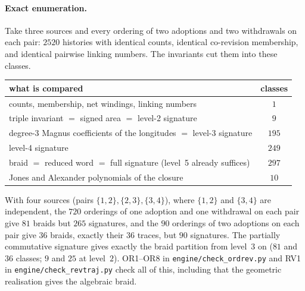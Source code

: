 \documentclass[11pt]{article}
\theoremstyle{definition}\newtheorem{definition}[theorem]{Definition}\newtheorem{remark}[theorem]{Remark}\newtheorem{example}[theorem]{Example}\newtheorem{problem}[theorem]{Open problem}\crefname{problem}{Problem}{Problems}
\begin{document}
\paragraph{Exact enumeration.} Take three sources and every ordering of two adoptions and two withdrawals on each pair: $2520$ histories with identical counts, identical co-revision membership, and identical pairwise linking numbers. The invariants cut them into these classes.
\begin{center}\small
\begin{tabular}{@{}lc@{}}
\toprule
what is compared & classes\\\midrule
counts, membership, net windings, linking numbers & $1$\\
triple invariant $=$ signed area $=$ level-2 signature & $9$\\
degree-3 Magnus coefficients of the longitudes $=$ level-3 signature & $195$\\
level-4 signature & $249$\\
braid $=$ reduced word $=$ full signature (level~5 already suffices) & $297$\\
Jones and Alexander polynomials of the closure & $10$\\
\bottomrule
\end{tabular}
\end{center}
With four sources (pairs $\{1,2\},\{2,3\},\{3,4\}$), where $\{1,2\}$ and $\{3,4\}$ are independent, the $720$ orderings of one adoption and one withdrawal on each pair give $81$ braids but $265$ signatures, and the $90$ orderings of two adoptions on each pair give $36$ braids, exactly their $36$ traces, but $90$ signatures. The partially commutative signature gives exactly the braid partition from level~$3$ on ($81$ and $36$ classes; $9$ and $25$ at level~$2$). OR1--OR8 in \texttt{engine/check\_ordrev.py} and RV1 in \texttt{engine/check\_revtraj.py} check all of this, including that the geometric realisation gives the algebraic braid.
\end{document}
